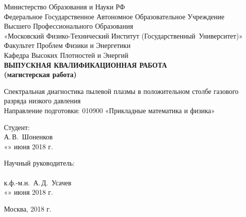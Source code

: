 \begin{center}
    Министерство Образования и Науки РФ\\
    Федеральное Государственное Автономное Образовательное Учреждение Высшего Профессионального Образования\\
    «Московский Физико-Технический Институт (Государственный~Университет)»\\[15mm]

    Факультет Проблем Физики и Энергетики\\
    Кафедра Высоких Плотностей и Энергий\\[20mm]

    \textbf{
        ВЫПУСКНАЯ КВАЛИФИКАЦИОННАЯ РАБОТА\\
        (магистерская работа)\\[10mm]
    }

    Спектральная диагностика пылевой плазмы в положительном столбе газового разряда низкого давления\\[10mm]

Направление подготовки: 010900 «Прикладные математика и физика»\\[20mm]
\end{center}

\newlength{\ML}
\hfill\begin{minipage}{0.5\textwidth}
  Студент:\\
  \underline{\hspace{\ML}} А.\,В.~Шоненков\\
  «\underline{\hspace{0.7cm}}» июня 2018 г.\\[5mm]
\end{minipage}%

\hfill\begin{minipage}{0.5\textwidth}
  Научный руководитель:\\
  \underline{\hspace{\ML}}\\к.ф.-м.н.~А.\,Д.~Усачев\\
  «\underline{\hspace{0.7cm}}» июня 2018 г.
\end{minipage}%

\vfill

\begin{center}
  Москва, 2018 г.
\end{center}

\thispagestyle{empty}
